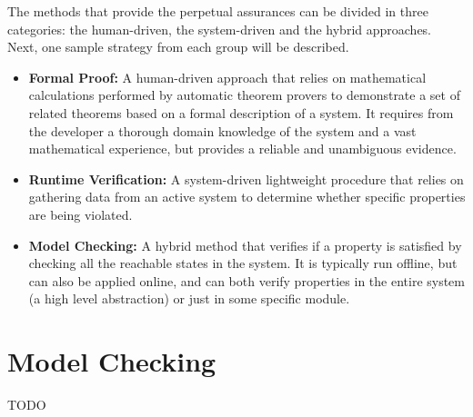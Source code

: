 The methods that provide the perpetual assurances can be divided in three categories: the human-driven, the system-driven and the hybrid approaches. Next, one sample strategy from each group will be described.

\begin{itemize}
    \item \textbf{Formal Proof:} A human-driven approach that relies on mathematical calculations performed by automatic theorem provers to demonstrate a set of related theorems based on a formal description of a system. It requires from the developer a thorough domain knowledge of the system and a vast mathematical experience, but provides a reliable and unambiguous evidence. 
    
	\item \textbf{Runtime Verification:} A system-driven lightweight procedure that relies on gathering data from an active system to determine whether specific properties are being violated.
	
	\item \textbf{Model Checking:} A hybrid method that verifies if a property is satisfied by checking all the reachable states in the system. It is typically run offline, but can also be applied online, and can both verify properties in the entire system (a high level abstraction) or just in some specific module.
    
\end{itemize}


\section{Model Checking}
TODO 




